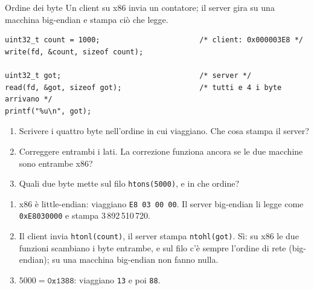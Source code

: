 \begin{esercizio}{Ordine dei byte}
Un client su x86 invia un contatore; il server gira su una macchina big-endian e stampa ciò che legge.
\begin{lstlisting}[language={[POSIX]C}]
uint32_t count = 1000;                       /* client: 0x000003E8 */
write(fd, &count, sizeof count);

uint32_t got;                                /* server */
read(fd, &got, sizeof got);                  /* tutti e 4 i byte arrivano */
printf("%u\n", got);
\end{lstlisting}
\begin{enumerate}[label=(\alph*)]
    \item Scrivere i quattro byte nell'ordine in cui viaggiano. Che cosa stampa il server?
    \item Correggere entrambi i lati. La correzione funziona ancora se le due macchine sono entrambe x86?
    \item Quali due byte mette sul filo \texttt{htons(5000)}, e in che ordine?
\end{enumerate}

\svolgimento
\begin{enumerate}[label=(\alph*)]
    \item x86 è little-endian: viaggiano \texttt{E8 03 00 00}. Il server big-endian li legge come \texttt{0xE8030000} e stampa
          3\,892\,510\,720.
    \item Il client invia \texttt{htonl(count)}, il server stampa \texttt{ntohl(got)}. Sì: su x86 le due funzioni scambiano i byte
          entrambe, e sul filo c'è sempre l'ordine di rete (big-endian); su una macchina big-endian non fanno nulla.
    \item $5000 = \texttt{0x1388}$: viaggiano \texttt{13} e poi \texttt{88}.
\end{enumerate}
\end{esercizio}

